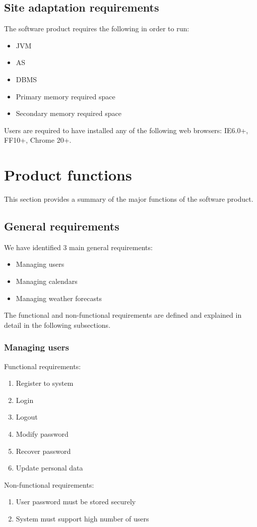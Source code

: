 \documentclass[10pt,a4paper,titlepage]{article}
\begin{document}
\subsection{Site adaptation requirements}
The software product requires the following in order to run:
\begin{itemize}
\item JVM
\item AS
\item DBMS
\item Primary memory required space
\item Secondary memory required space
\end{itemize}
Users are required to have installed any of the following web browsers: IE6.0+, FF10+, Chrome 20+.

\section{Product functions}
This section provides a summary of the major functions of the software product.

\subsection{General requirements}
We have identified 3 main general requirements:
\begin{itemize}
\item Managing users
\item Managing calendars
\item Managing weather forecasts
\end{itemize}
The functional and non-functional requirements are defined and explained in detail in the following subsections.

\subsubsection{Managing users}
Functional requirements:
\begin{enumerate}[label = FR \arabic*:]
\item Register to system
\item Login
\item Logout
\item Modify password
\item Recover password
\item Update personal data
\end{enumerate}
Non-functional requirements:
\begin{enumerate}[label = NFR \arabic*:]
\item User password must be stored securely
\item System must support high number of users
\end{enumerate}
\end{document}

